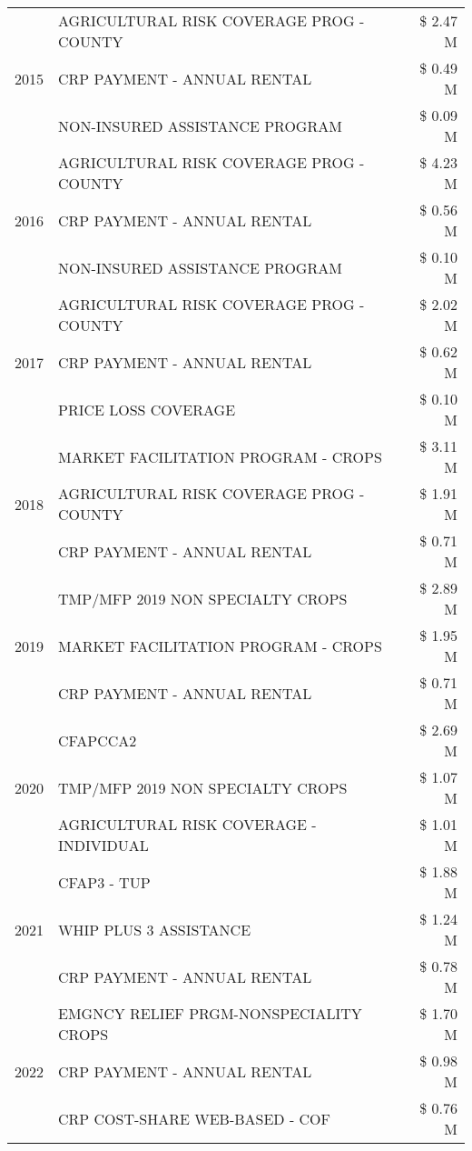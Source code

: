 \begin{tabular}{llr}
\cline{1-3}
\multirow[t]{3}{*}{2015} & AGRICULTURAL RISK COVERAGE PROG - COUNTY & \$ 2.47 M \\
 & CRP PAYMENT - ANNUAL RENTAL & \$ 0.49 M \\
 & NON-INSURED ASSISTANCE PROGRAM & \$ 0.09 M \\
\cline{1-3}
\multirow[t]{3}{*}{2016} & AGRICULTURAL RISK COVERAGE PROG - COUNTY & \$ 4.23 M \\
 & CRP PAYMENT - ANNUAL RENTAL & \$ 0.56 M \\
 & NON-INSURED ASSISTANCE PROGRAM & \$ 0.10 M \\
\cline{1-3}
\multirow[t]{3}{*}{2017} & AGRICULTURAL RISK COVERAGE PROG - COUNTY & \$ 2.02 M \\
 & CRP PAYMENT - ANNUAL RENTAL & \$ 0.62 M \\
 & PRICE LOSS COVERAGE & \$ 0.10 M \\
\cline{1-3}
\multirow[t]{3}{*}{2018} & MARKET FACILITATION PROGRAM - CROPS & \$ 3.11 M \\
 & AGRICULTURAL RISK COVERAGE PROG - COUNTY & \$ 1.91 M \\
 & CRP PAYMENT - ANNUAL RENTAL & \$ 0.71 M \\
\cline{1-3}
\multirow[t]{3}{*}{2019} & TMP/MFP 2019 NON SPECIALTY CROPS & \$ 2.89 M \\
 & MARKET FACILITATION PROGRAM - CROPS & \$ 1.95 M \\
 & CRP PAYMENT - ANNUAL RENTAL & \$ 0.71 M \\
\cline{1-3}
\multirow[t]{3}{*}{2020} & CFAPCCA2 & \$ 2.69 M \\
 & TMP/MFP 2019 NON SPECIALTY CROPS & \$ 1.07 M \\
 & AGRICULTURAL RISK COVERAGE - INDIVIDUAL & \$ 1.01 M \\
\cline{1-3}
\multirow[t]{3}{*}{2021} & CFAP3 - TUP & \$ 1.88 M \\
 & WHIP PLUS 3 ASSISTANCE & \$ 1.24 M \\
 & CRP PAYMENT - ANNUAL RENTAL & \$ 0.78 M \\
\cline{1-3}
\multirow[t]{3}{*}{2022} & EMGNCY RELIEF PRGM-NONSPECIALITY CROPS & \$ 1.70 M \\
 & CRP PAYMENT - ANNUAL RENTAL & \$ 0.98 M \\
 & CRP COST-SHARE WEB-BASED - COF & \$ 0.76 M \\
\cline{1-3}
\bottomrule
\end{tabular}
